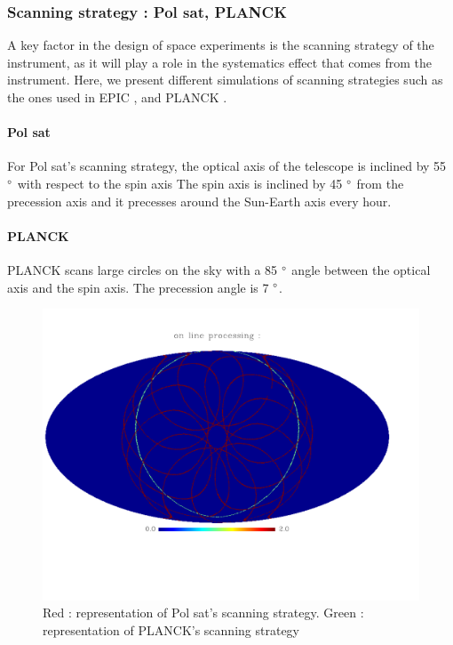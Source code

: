 \subsubsection{Scanning strategy : Pol sat, PLANCK}
A key factor in the design of space experiments is the scanning strategy of the instrument, as it will play a role in the systematics effect that comes from the instrument. Here, we present different simulations of scanning strategies such as the ones used in EPIC \citep{2009arXiv0906.1188B}, and PLANCK \citep{2005A&A...430..363D}.

\paragraph{Pol sat \\}
For Pol sat's scanning strategy, the optical axis of the telescope is inclined by 55 $\degree$ with respect to the spin axis The spin axis is inclined by 45 $\degree$ from the precession axis and it precesses around the Sun-Earth axis every hour.

\paragraph{PLANCK \\}
PLANCK scans large circles on the sky with a 85 $\degree$ angle between the optical axis and the spin axis. The precession angle is 7 $\degree$.

\begin{figure}[h]
\center
	\includegraphics[scale=0.3]{Figures/scan_strat_planck_polsat.pdf}
	\caption{Red : representation of Pol sat's scanning strategy. Green : representation of PLANCK's scanning strategy }
	\label{fig:strat_polsat}
\end{figure}

